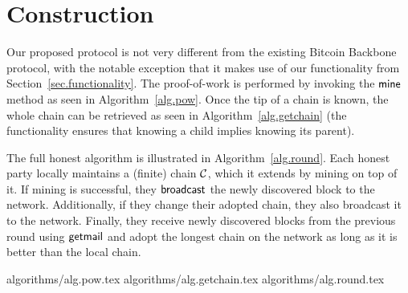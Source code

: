 \section{Construction}\label{sec.construction}

Our proposed protocol is not very different from the existing Bitcoin Backbone
protocol, with the notable exception that it makes use of our functionality
from Section~\ref{sec.functionality}. The proof-of-work is performed by invoking
the $\textsf{mine}$ method as seen in Algorithm~\ref{alg.pow}. Once the tip of a chain
is known, the whole chain can be retrieved as seen in
Algorithm~\ref{alg.getchain} (the functionality ensures that knowing a child
implies knowing its parent).

The full honest algorithm is illustrated in Algorithm~\ref{alg.round}. Each
honest party locally maintains a (finite) chain $\mathcal{C}$, which it extends by
mining on top of it. If mining is successful, they $\textsf{broadcast}$ the newly
discovered block to the network. Additionally, if they change their adopted
chain, they also broadcast it to the network. Finally, they receive newly
discovered blocks from the previous round using $\textsf{getmail}$ and adopt the longest
chain on the network as long as it is better than the local chain.

{algorithms/alg.pow.tex}
{algorithms/alg.getchain.tex}
{algorithms/alg.round.tex}

